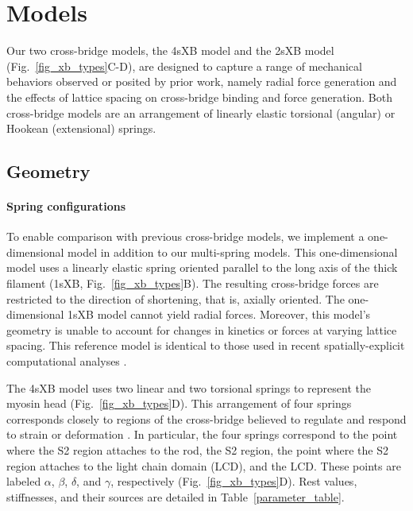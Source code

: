 \documentclass[10pt]{article}
\newcommand{\citep}[1]{\cite{#1}} %
\begin{document}
\section*{Models}  %

Our two cross-bridge models, the 4sXB model and the 2sXB model (Fig.~\ref{fig_xb_types}C-D), are designed to capture a range of mechanical behaviors observed or posited by prior work, namely radial force generation and the effects of lattice spacing on cross-bridge binding and force generation.  
Both cross-bridge models are an arrangement of linearly elastic torsional (angular) or Hookean (extensional) springs.  

\subsection*{Geometry} %

\paragraph{Spring configurations} %
To enable comparison with previous cross-bridge models, we implement a one-dimensional model in addition to our multi-spring models. 
This one-dimensional model uses a linearly elastic spring oriented parallel to the long axis of the thick filament (1sXB, Fig.~\ref{fig_xb_types}B).  
The resulting cross-bridge forces are restricted to the direction of shortening, that is, axially oriented. 
The one-dimensional 1sXB model cannot yield radial forces.
Moreover, this model's geometry is unable to account for changes in kinetics or forces at varying lattice spacing. 
This reference model is identical to those used in recent spatially-explicit computational analyses \citep{Daniel1998, Chase2004, Tanner2007}. 

The 4sXB model uses two linear and two torsional springs to represent the myosin head (Fig.~\ref{fig_xb_types}D).
This arrangement of four springs corresponds closely to regions of the cross-bridge believed to regulate and respond to strain or deformation \citep{Houdusse2001}.
In particular, the four springs correspond to the point where the S2 region attaches to the rod, the S2 region, the point where the S2 region attaches to the light chain domain (LCD), and the LCD.
These points are labeled $\alpha$, $\beta$, $\delta$, and $\gamma$, respectively (Fig.~\ref{fig_xb_types}D).
Rest values, stiffnesses, and their sources are detailed in Table~\ref{parameter_table}. 
\end{document}
